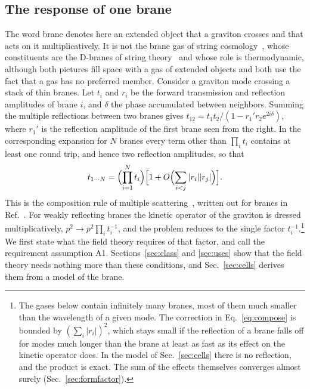 \documentclass[aps,prd,10pt,twocolumn,superscriptaddress,nofootinbib,floatfix,longbibliography]{revtex4-2}
\begin{document}
\subsection{The response of one brane}
\label{sec:onebrane}

The word brane denotes here an extended object that a graviton crosses and that acts on it multiplicatively. It is not the brane gas of string cosmology~\cite{BrandenbergerVafa1989,AlexanderBrandenbergerEasson2000}, whose constituents are the D-branes of string theory~\cite{DaiLeighPolchinski1989,Polchinski1995} and whose role is thermodynamic, although both pictures fill space with a gas of extended objects and both use the fact that a gas has no preferred member. Consider a graviton mode crossing a stack of thin branes. Let $t_i$ and $r_i$ be the forward transmission and reflection amplitudes of brane $i$, and $\delta$ the phase accumulated between neighbors. Summing the multiple reflections between two branes gives $t_{12}=t_1t_2/(1-r_1'r_2e^{2i\delta})$, where $r_1'$ is the reflection amplitude of the first brane seen from the right. In the corresponding expansion for $N$ branes every term other than $\prod_it_i$ contains at least one round trip, and hence two reflection amplitudes, so that
\begin{equation}
\label{eq:compose}
t_{1\cdots N}=\Bigl(\prod_{i=1}^Nt_i\Bigr)\Bigl[1+O\Bigl(\sum_{i<j}|r_i||r_j|\Bigr)\Bigr].
\end{equation}
This is the composition rule of multiple scattering~\cite{Foldy1945,Lax1951}, written out for branes in Ref.~\cite{Bhattacharjee2026}. For weakly reflecting branes the kinetic operator of the graviton is dressed multiplicatively, $p^2\to p^2\prod_it_i^{-1}$, and the problem reduces to the single factor $t_i^{-1}$.\footnote{The gases below contain infinitely many branes, most of them much smaller than the wavelength of a given mode. The correction in Eq.~\eqref{eq:compose} is bounded by $(\sum_i|r_i|)^2$, which stays small if the reflection of a brane falls off for modes much longer than the brane at least as fast as its effect on the kinetic operator does. In the model of Sec.~\ref{sec:cells} there is no reflection, and the product is exact. The sum of the effects themselves converges almost surely (Sec.~\ref{sec:formfactor}).} We first state what the field theory requires of that factor, and call the requirement assumption A1. Sections~\ref{sec:class} and \ref{sec:uses} show that the field theory needs nothing more than these conditions, and Sec.~\ref{sec:cells} derives them from a model of the brane.
\end{document}

